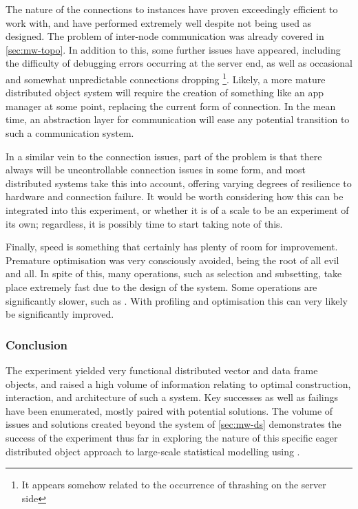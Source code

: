 The nature of the connections to  instances have proven exceedingly efficient to work with, and have performed extremely well despite not being used as designed.
The problem of inter-node communication was already covered in \cref{sec:mw-topo}.
In addition to this, some further issues have appeared, including the difficulty of debugging errors occurring at the server end, as well as occasional and somewhat unpredictable connections dropping \footnote{It appears somehow related to the occurrence of thrashing on the server side}.
Likely, a more mature distributed object system will require the creation of something like an app manager at some point, replacing the current  form of connection.
In the mean time, an abstraction layer for communication will ease any potential transition to such a communication system.

In a similar vein to the connection issues, part of the problem is that there always will be uncontrollable connection issues in some form, and most distributed systems take this into account, offering varying degrees of resilience to hardware and connection failure.
It would be worth considering how this can be integrated into this experiment, or whether it is of a scale to be an experiment of its own; regardless, it is possibly time to start taking note of this.

Finally, speed is something that certainly has plenty of room for improvement.
Premature optimisation was very consciously avoided, being the root of all evil and all.
In spite of this, many operations, such as selection and subsetting, take place extremely fast due to the design of the system.
Some operations are significantly slower, such as .
With profiling and optimisation this can very likely be significantly improved.

\subsubsection{Conclusion}\label{conclusion}

The experiment yielded very functional distributed vector and data frame objects, and raised a high volume of information relating to optimal construction, interaction, and architecture of such a system.
Key successes as well as failings have been enumerated, mostly paired with potential solutions.
The volume of issues and solutions created beyond the system of \cref{sec:mw-ds} demonstrates the success of the experiment thus far in exploring the nature of this specific eager distributed object approach to large-scale statistical modelling using \R{}.
